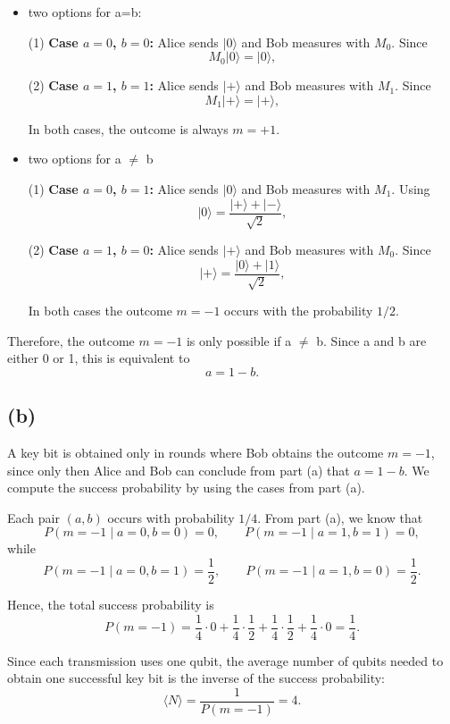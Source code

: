\documentclass{article}
\begin{document}
\begin{itemize}
    \item two options for a=b: 
    
    (1) \textbf{Case $a=0$, $b=0$:} Alice sends $|0\rangle$ and Bob measures with $M_0$. Since
    \[
    M_0|0\rangle = |0\rangle,
    \]
    
    (2) \textbf{Case $a=1$, $b=1$:} Alice sends $|+\rangle$ and Bob measures with $M_1$. Since
    \[
    M_1|+\rangle = |+\rangle,
    \]
    
    In both cases, the outcome is always $m=+1$.

    \item two options for a $\neq$ b
    
    (1) \textbf{Case $a=0$, $b=1$:} Alice sends $|0\rangle$ and Bob measures with $M_1$. Using
    \[
    |0\rangle=\frac{|+\rangle+|-\rangle}{\sqrt{2}},
    \]
    
    (2) \textbf{Case $a=1$, $b=0$:} Alice sends $|+\rangle$ and Bob measures with $M_0$. Since
    \[
    |+\rangle=\frac{|0\rangle+|1\rangle}{\sqrt{2}},
    \]
    
    In both cases the outcome $m=-1$ occurs with the probability $1/2$.
\end{itemize}
 
Therefore, the outcome $m=-1$ is only possible if a $\neq$ b. Since a and b are either 0 or 1, this is equivalent to 
\[
\boxed{a=1-b.}
\]
\subsection*{(b)}
A key bit is obtained only in rounds where Bob obtains the outcome $m=-1$,
since only then Alice and Bob can conclude from part (a) that $a=1-b$.
We compute the success probability by using the cases from part (a).

Each pair $(a,b)$ occurs with probability $1/4$. From part (a), we know that
\[
P(m=-1 \mid a=0,b=0)=0,\qquad P(m=-1 \mid a=1,b=1)=0,
\]
while
\[
P(m=-1 \mid a=0,b=1)=\frac{1}{2},\qquad P(m=-1 \mid a=1,b=0)=\frac{1}{2}.
\]

Hence, the total success probability is
\[
P(m=-1)=\frac{1}{4}\cdot 0 + \frac{1}{4}\cdot \frac{1}{2}
+ \frac{1}{4}\cdot \frac{1}{2} + \frac{1}{4}\cdot 0
= \frac{1}{4}.
\]

Since each transmission uses one qubit,
the average number of qubits needed to obtain one successful key bit is the
inverse of the success probability:
\[
\boxed{\langle N \rangle = \frac{1}{P(m=-1)} = 4.}
\]
\end{document}
